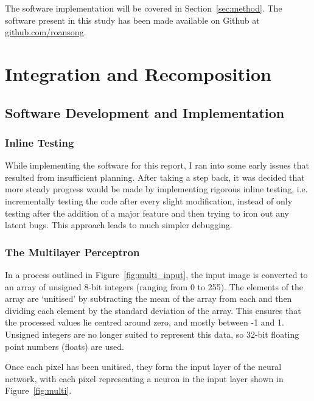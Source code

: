 The software implementation will be covered in Section~\ref{sec:method}.
The software present in this study has been made available on Github at~ \href{http://github.com/roansong}{github.com/roansong}.

\section{Integration and Recomposition}
\subsection{Software Development and Implementation}

\subsubsection{Inline Testing}
While implementing the software for this report, I ran into some early issues that resulted from insufficient planning. After taking a step back, it was decided that more steady progress would be made by implementing rigorous inline testing, i.e. incrementally testing the code after every slight modification, instead of only testing after the addition of a major feature and then trying to iron out any latent bugs. This approach leads to much simpler debugging.

\subsubsection{The Multilayer Perceptron}



 In a process outlined in Figure~\ref{fig:multi_input}, the input image is converted to an array of unsigned 8-bit integers (ranging from 0 to 255). The elements of the array are `unitised' by subtracting the mean of the array from each and then dividing each element by the standard deviation of the array. This ensures that the processed values lie centred around zero, and mostly between -1 and 1. Unsigned integers are no longer suited to represent this data, so 32-bit floating point numbers (floats) are used. %
 
 Once each pixel has been unitised, they form the input layer of the neural network, with each pixel representing a neuron in the input layer shown in Figure~\ref{fig:multi}. 
 
